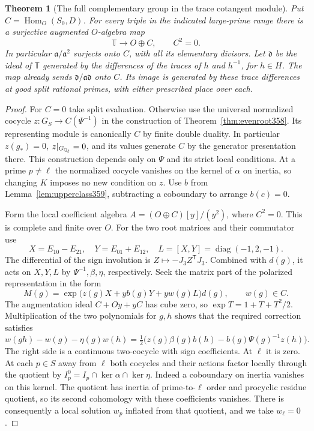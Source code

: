 \documentclass[a4paper,11pt]{article}
\newtheorem{theorem}[proposition]{Theorem}
\theoremstyle{definition}
\theoremstyle{remark}
\numberwithin{equation}{section}
\begin{document}
\begin{theorem}[The full complementary group in the trace cotangent module]
\label{thm:mixedtrace359}
Put \(C=\operatorname{Hom}_O(S_0,D)\). For every triple in
the indicated large-prime range there is a surjective augmented
\(O\)-algebra map
\[
          \mathbb T\longrightarrow O\oplus C,\qquad C^2=0 .
\]
In particular \(\mathfrak a/\mathfrak a^2\) surjects onto \(C\),
with all its elementary divisors. Let \(\mathfrak d\) be the
ideal of \(\mathbb T\) generated by the differences of the traces
of \(h\) and \(h^{-1}\), for \(h\in H\). The map already sends
\(\mathfrak d/\mathfrak a\mathfrak d\) onto \(C\).
Its image is generated by these trace differences at good
split rational primes, with either prescribed place over each.
\end{theorem}
\begin{proof}
For \(C=0\) take split evaluation. Otherwise use the universal
normalized cocycle \(z:G_S\to C(\Psi^{-1})\) in the construction
of Theorem~\ref{thm:evenroot358}. Its representing module is
canonically \(C\) by finite double duality. In particular
\(z(g_*)=0\), \(z|_{G_{\mathbb Q_\ell}}=0\), and its values generate
\(C\) by the generator presentation there. This construction
depends only on \(\Psi\) and its strict local conditions. At a
prime \(p\ne\ell\) the normalized cocycle vanishes on the kernel
of \(\alpha\) on inertia, so changing \(K\) imposes no new
condition on \(z\). Use \(b\) from
Lemma~\ref{lem:upperclass359}, subtracting a coboundary to
arrange \(b(c)=0\).

Form the local coefficient algebra \(A=(O\oplus C)[y]/(y^2)\),
where \(C^2=0\). This is complete and finite over \(O\).
For the two root matrices and their commutator use
\[
 X=E_{10}-E_{21},\quad Y=E_{01}+E_{12},\quad
 L=[X,Y]=\operatorname{diag}(-1,2,-1).
\]
The differential of the sign involution is
\(Z\mapsto-J_3 Z^{\mathsf T}J_3\). Combined with \(d(g)\), it
acts on \(X,Y,L\) by \(\Psi^{-1},\beta,\eta\), respectively.
Seek the matrix part of the polarized representation in the form
\[
 M(g)=\exp\bigl(z(g)X+y b(g)Y+y w(g)L\bigr)d(g),\qquad
                           w(g)\in C .
\]
The augmentation ideal \(C+Oy+yC\) has cube zero, so
\(\exp T=1+T+T^2/2\). Multiplication of the two polynomials
for \(g,h\) shows that the required correction satisfies
\[
 w(gh)-w(g)-\eta(g)w(h)
 =\tfrac12\bigl(z(g)\beta(g)b(h)-b(g)\Psi(g)^{-1}z(h)\bigr).
\]
The right side is a continuous two-cocycle with sign coefficients.
At \(\ell\) it is zero. At each \(p\in S\) away from \(\ell\)
both cocycles and their actions factor locally through the quotient
by \(I_p^0=I_p\cap\ker\alpha\cap\ker\eta\). Indeed a coboundary
on inertia vanishes on this kernel. The quotient has inertia
of prime-to-\(\ell\) order and procyclic residue quotient, so
its second cohomology with these coefficients vanishes.
There is consequently a local solution \(w_p\) inflated from
that quotient, and we take \(w_\ell=0\).


\end{proof}
\end{document}
